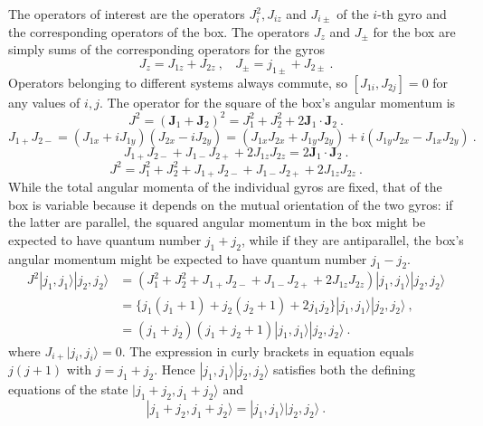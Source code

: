 \documentclass[12pt,a4paper]{article}
\renewcommand{\vec}[1]{\boldsymbol{#1}}
\begin{document}
The operators of interest are the operators $J_i^2, J_{iz}$ and $J_{i \pm}$ of the $i$-th gyro and the corresponding operators of the box. The operators $J_z$ and $J_\pm$ for the box are simply sums of the corresponding operators for the gyros
\begin{equation}
J_z = J_{1z} +J_{2z} ~, ~~~~ J_\pm = j_{1\pm} +J_{2\pm} ~.
\end{equation}
Operators belonging to different systems always commute, so $[J_{1i}, J_{2j}] = 0$ for any values of $i, j$. The operator for the square of the box's angular momentum is
\begin{equation}
J^2 = (\vec{J}_1 +\vec{J}_2)^2 = J_1^2 +J_2^2 +2\vec{J}_1\cdot \vec{J}_2 ~.
\end{equation}
\begin{equation}
J_{1+}J_{2-} = (J_{1x} +iJ_{1y} )(J_{2x} -iJ_{2y} ) = (J_{1x}J_{2x} +J_{1y}J_{2y} ) +i(J_{1y}J_{2x}  - J_{1x}J_{2y} ) ~.
\end{equation}
\begin{equation}
J_{1+}J_{2-} +J_{1-}J_{2+} +2J_{1z}J_{2z} = 2 \vec{J}_1\cdot \vec{J}_2 ~.
\end{equation}
\begin{equation}
J^2 = J_1^2 +J_2^2 + J_{1+}J_{2-} +J_{1-}J_{2+} +2J_{1z}J_{2z} ~.
\end{equation}
While the total angular momenta of the individual gyros are fixed, that of the box is variable because it depends on the mutual orientation of the two gyros: if the latter are parallel, the squared angular momentum in the box might be expected to have quantum number $j_1 + j_2$, while if they are antiparallel, the box’s angular momentum might be expected to have quantum number $j_1 - j_2$.
\begin{align}
\nonumber J^2 |j_1, j_1 \rangle |j_2, j_2 \rangle &= (J_1^2 +J_2^2 +J_{1+}J_{2-} +J_{1-}J_{2+} +2 J_{1z} J_{2z}) |j_1, j_1 \rangle |j_2, j_2 \rangle \\
\nonumber &= \{j_1(j_1 +1) +j_2(j_2 +1) +2j_1 j_2 \} |j_1, j_1 \rangle |j_2, j_2 \rangle ~, \\
&= (j_1+j_2)(j_1+j_2 +1)  |j_1, j_1 \rangle |j_2, j_2 \rangle ~.
\end{align}
where $J_{i+} |j_i, j_i \rangle = 0$. The expression in curly brackets in equation equals $j(j+1)$ with $j = j_1 +j_2$. Hence $|j_1, j_1\rangle |j_2, j_2 \rangle$ satisfies both the defining equations of the state $|j_1 + j_2, j_1 + j_2 \rangle$ and 
\begin{equation}
|j_1 + j_2, j_1 + j_2 \rangle =  |j_1, j_1 \rangle |j_2, j_2 \rangle ~.
\end{equation}
\end{document}
